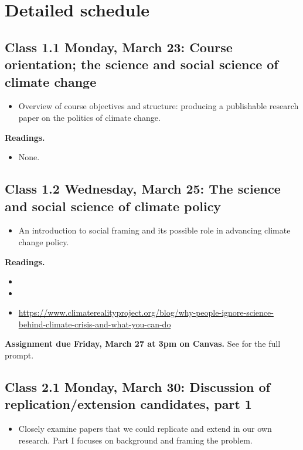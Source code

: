 \documentclass[letterpaper, 12pt, parskip=full, DIV=10]{scrartcl}
\begin{document}
\section*{Detailed schedule}

\subsection*{Class 1.1 Monday, March 23: Course orientation; the science and social science of climate change}
\begin{itemize}
\item Overview of course objectives and structure: producing a publishable research paper on the politics of climate change.
\end{itemize}

\textbf{Readings.}
\begin{itemize}
\item None.
\end{itemize}


\subsection*{Class 1.2 Wednesday, March 25: The science and social science of climate policy}
\begin{itemize}
\item An introduction to social framing and its possible role in advancing climate change policy.
\end{itemize}

\textbf{Readings.}
\begin{itemize}
\item {}
\item {}
\item {} \url{https://www.climaterealityproject.org/blog/why-people-ignore-science-behind-climate-crisis-and-what-you-can-do}
\end{itemize}

\textbf{Assignment due Friday, March 27 at 3pm on Canvas.}
See  for the full prompt.

\subsection*{Class 2.1 Monday, March 30: Discussion of replication/extension candidates, part 1}
\begin{itemize}
\item Closely examine papers that we could replicate and extend in our own research. Part I focuses on background and framing the problem.
\end{itemize}
\end{document}
